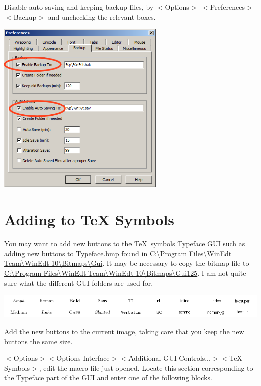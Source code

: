 Disable auto-saving and keeping backup files, by $<$Options$>$ $<$Preferences$>$$<$Backup$>$ and unchecking the relevant boxes.

\centerline{\includegraphics[bb= 0 0 437 457,width=0.6\textwidth]{pic/savingback.png}}




\section{Adding to TeX Symbols }
You may want to add new buttons to the \TeX\ symbols Typeface GUI such as adding new buttons to \url{Typeface.bmp} found in \url{C:\Program Files\WinEdt Team\WinEdt 10\Bitmaps\Gui}.  It may be necessary to copy the bitmap file to \url{C:\Program Files\WinEdt Team\WinEdt 10\Bitmaps\Gui125}. I am not quite sure what the different GUI folders are used for.

\centerline{\includegraphics[bb= 0 0 999 88, width=\textwidth]{pic/Typeface.png}}

Add the new buttons to the current image, taking care that you keep the new buttons the same size.

$<$Options$>$$<$Options Interface$>$$<$Additional GUI Controls...$>$$<$TeX Symbols$>$, edit the macro file just opened. Locate this section corresponding to the Typeface part of the GUI and enter one of the following blocks.

